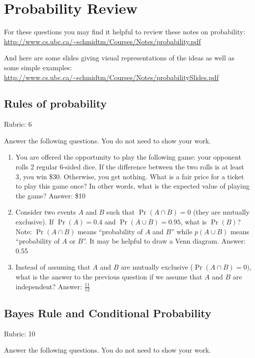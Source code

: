 \documentclass{article}
\newcommand{\ans}[1]{\green{Answer: #1}}
\newcommand{\rubric}[1]{\green{Rubric: #1}}
\newcommand{\blue}[1]{{\color{blue}#1}}
\newcommand{\green}[1]{{\color{green}#1}}
\begin{document}
    \section{Probability Review}
    For these questions you may find it helpful to review these notes on probability:\\
    \url{http://www.cs.ubc.ca/~schmidtm/Courses/Notes/probability.pdf}
    
    And here are some slides giving visual representations of the ideas as well as some simple examples:\\
    \url{http://www.cs.ubc.ca/~schmidtm/Courses/Notes/probabilitySlides.pdf}

    \subsection{Rules of probability}
    \rubric{6}

    \blue{Answer the following questions.} You do not need to show your work.

    \begin{enumerate}
        \item You are offered the opportunity to play the following game: your opponent rolls 2 regular 6-sided dice. If the difference between the two rolls is at least 3, you win \$30. Otherwise, you get nothing. What is a fair price for a ticket to play this game once? In other words, what is the expected value of playing the game? \ans{\$10}
        \item Consider two events $A$ and $B$ such that $\Pr(A \cap B)=0$ (they are mutually exclusive). If $\Pr(A) = 0.4$ and $\Pr(A \cup B) = 0.95$, what is $\Pr(B)$? Note: $\Pr(A \cap B)$ means
        ``probability of $A$ and $B$'' while $p(A \cup B)$ means ``probability of $A$ or $B$''. It may be helpful to draw a Venn diagram. \ans{0.55}
        \item Instead of assuming that $A$ and $B$ are mutually exclusive ($\Pr(A \cap B) = 0)$, what is the answer to the previous question if we assume that $A$ and $B$ are independent? \ans{$\frac{11}{12}$}
    \end{enumerate}

    \subsection{Bayes Rule and Conditional Probability}
    \rubric{10}

    \blue{Answer the following questions.} You do not need to show your work.
\end{document}
